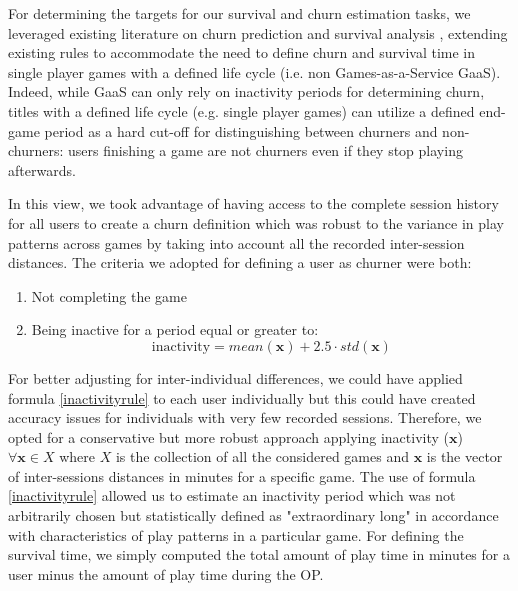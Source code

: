 For determining the targets for our survival and churn estimation tasks, we leveraged existing literature on churn prediction \cite{drachen2016rapid, milovsevic2017early, lee2018game, perianez2016churn, runge2014churn, kim2017churn, hadiji2014predicting, xie2015predicting} and survival analysis \cite{viljanen2018playtime, demediuk2018player, lee2018game, bertens2017games}, extending existing rules to accommodate the need to define churn and survival time in single player games with a defined life cycle (i.e. non Games-as-a-Service GaaS). Indeed, while GaaS can only rely on inactivity periods for determining churn, titles with a defined life cycle (e.g. single player games) can utilize a defined end-game period as a hard cut-off for distinguishing between churners and non-churners: users finishing a game are not churners even if they stop playing afterwards. 

In this view, we took advantage of having access to the complete session history for all users to create a churn definition which was robust to the variance in play patterns across games by taking into account all the recorded inter-session distances. The criteria we adopted for defining a user as churner were both: 

\begin{enumerate}
    \item Not completing the game
    \item Being inactive for a period equal or greater to:
        \begin{equation}
            \label{inactivityrule}
            \text{inactivity} = 
            mean(\mathbf{x}) + 2.5 \cdot std(\mathbf{x})
        \end{equation}
\end{enumerate}

For better adjusting for inter-individual differences, we could have applied formula \ref{inactivityrule} to each user individually but this could have created accuracy issues for individuals with very few recorded sessions. Therefore, we opted for a conservative but more robust approach applying inactivity ($\mathbf{x}$) $\forall \mathbf{x} \in X$ where $X$ is the collection of all the considered games and $\mathbf{x}$ is the vector of inter-sessions distances in minutes for a specific game. The use of formula \ref{inactivityrule} allowed us to estimate an inactivity period which was not arbitrarily chosen but statistically defined as "extraordinary long" in accordance with characteristics of play patterns in a particular game. For defining the survival time, we simply computed the total amount of play time in minutes for a user minus the amount of play time during the OP.

